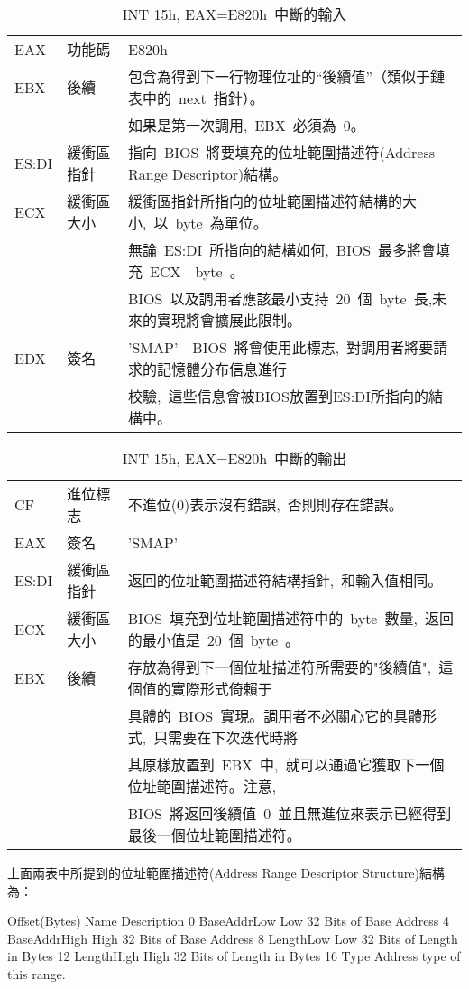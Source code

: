 \begin{center}\begin{longtable}{lll}
\caption[]{INT 15h, EAX=E820h~中斷的輸入}\label{e820_input}\\
\hline
EAX & 功能碼 & E820h\\
EBX & 後續   & 包含為得到下一行物理位址的“後續值”（類似于鏈表中的~next~指針）。\\
& & 如果是第一次調用,~EBX~必須為~0。\\
ES:DI & 緩衝區指針 & 指向~BIOS~將要填充的位址範圍描述符(Address Range Descriptor)結構。\\
ECX & 緩衝區大小 & 緩衝區指針所指向的位址範圍描述符結構的大小,~以~byte~為單位。\\
& & 無論~ES:DI~所指向的結構如何,~BIOS~最多將會填充~ECX~~byte~。\\
& & BIOS~以及調用者應該最小支持~20~個~byte~長,未來的實現將會擴展此限制。\\
EDX & 簽名 & 'SMAP' - BIOS~將會使用此標志,~對調用者將要請求的記憶體分布信息進行\\
& & 校驗,~這些信息會被BIOS放置到ES:DI所指向的結構中。\\
\hline
\end{longtable}\end{center}

\begin{center}\begin{longtable}{lll}
\caption[]{INT 15h, EAX=E820h~中斷的輸出}\label{e820_output}\\
\hline
CF & 進位標志 & 不進位(0)表示沒有錯誤,~否則則存在錯誤。\\
EAX & 簽名   & 'SMAP'\\
ES:DI & 緩衝區指針 & 返回的位址範圍描述符結構指針,~和輸入值相同。\\
ECX & 緩衝區大小 & BIOS~填充到位址範圍描述符中的~byte~數量,~返回的最小值是~20~個~byte~。\\
EBX & 後續 & 存放為得到下一個位址描述符所需要的"後續值",~這個值的實際形式倚賴于\\
& & 具體的~BIOS~實現。調用者不必關心它的具體形式,~只需要在下次迭代時將\\
& & 其原樣放置到~EBX~中,~就可以通過它獲取下一個位址範圍描述符。注意,~\\
& & BIOS~將返回後續值~0~並且無進位來表示已經得到最後一個位址範圍描述符。\\
\hline
\end{longtable}\end{center}

上面兩表中所提到的位址範圍描述符(Address Range Descriptor Structure)結構為：
\begin{Command}
Offset(Bytes)     Name        Description
      0       BaseAddrLow     Low 32 Bits of Base Address
      4       BaseAddrHigh    High 32 Bits of Base Address
      8       LengthLow       Low 32 Bits of Length in Bytes
     12       LengthHigh      High 32 Bits of Length in Bytes
     16       Type            Address type of  this range.
\end{Command}


